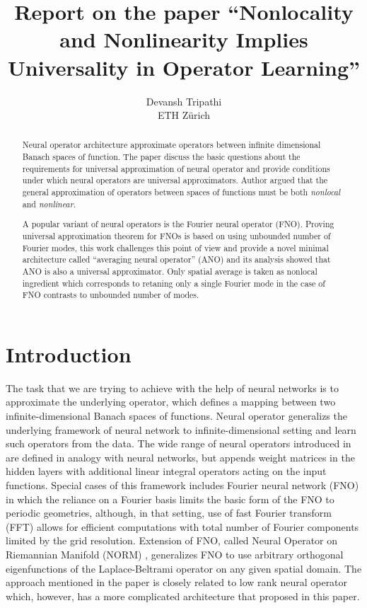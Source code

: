 \documentclass[reqno]{amsart}
\title{Report on the paper ``Nonlocality and Nonlinearity Implies Universality in Operator Learning''}
\author{Devansh Tripathi \\ ETH Z\lowercase{\"urich}}
\theoremstyle{plain}
\theoremstyle{definition}
\begin{document}
\begin{abstract}
    Neural operator architecture approximate operators between infinite dimensional Banach spaces of function. The paper discuss the basic questions about the requirements for universal approximation of neural operator and provide conditions under which neural operators are universal approximators. Author argued that the general approximation of operators between spaces of functions must be both {\it nonlocal} and {\it nonlinear}.

    A popular variant of neural operators is the Fourier neural operator (FNO). Proving universal approximation theorem for FNOs is based on using unbounded number of Fourier modes, this work challenges this point of view and provide a novel minimal architecture called ``averaging neural operator'' (ANO) and its analysis showed that ANO is also a universal approximator. Only spatial average is taken as nonlocal ingredient which corresponds to retaning only a single Fourier mode in the case of FNO contrasts to unbounded number of modes.    
\end{abstract}
\maketitle
\section{\bf \large Introduction}
\noindent The task that we are trying to achieve with the help of neural networks is to approximate the underlying operator, which defines a mapping between two infinite-dimensional Banach spaces of functions. Neural operator generalizs the underlying framework of neural network to infinite-dimensional setting and learn such operators from the data. The wide range of neural operators introduced in \cite{AAK2020, NK2023} are defined in analogy with neural networks, but appends weight matrices in the hidden layers with additional linear integral operators acting on the input functions. Special cases of this framework includes Fourier neural network (FNO) \cite{ZL2021} in which the reliance on a Fourier basis limits the basic form of the FNO to periodic geometries, although, in that setting, use of fast Fourier transform (FFT) allows for efficient computations with total number of Fourier components limited by the grid resolution. Extension of FNO, called Neural Operator on Riemannian Manifold (NORM) \cite{GC2023}, generalizes FNO to use arbitrary orthogonal eigenfunctions of the Laplace-Beltrami operator on any given  spatial domain. The approach mentioned in the paper is closely related to low rank neural operator \cite{NK2023} which, however, has a more complicated architecture that proposed in this paper.
\end{document}
